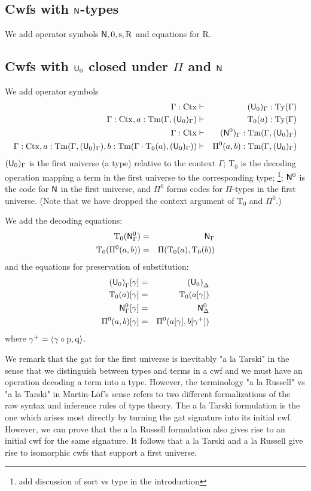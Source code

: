\documentclass{lmcs}
\newcommand{\s}{\mathrm{s}}
\newcommand{\Rec}{\mathrm{R}}
\newcommand{\Ta}{\mathrm{T}}
\def\Ctx{\mathrm{Ctx}}
\begin{document}
\subsection{Cwfs with $\mathsf{N}$-types} 
We add operator symbols $\N, 0, \s, \Rec$ and equations for $\Rec$.

\subsection{Cwfs with $\mathsf{U}_0$ closed under $\Pi$ and $\mathsf{N}$} 
We add operator symbols
\begin{eqnarray*}
\Gamma : \Ctx &\vdash& (\U_0)_\Gamma : \Ty(\Gamma)\\
\Gamma : \Ctx, a : \Tm(\Gamma,(\U_0)_\Gamma) &\vdash& {\Ta_0}(a) : \Ty(\Gamma)\\
\Gamma : \Ctx &\vdash& (\N^0)_\Gamma : \Tm(\Gamma,(\U_0)_\Gamma) \\
\Gamma : \Ctx, 
a : \Tm(\Gamma,(\U_0)_\Gamma), 
b :  \Tm(\Gamma \cdot \Ta_0(a), (\U_0)_\Gamma))
&\vdash&
 \Pi^0(a,b) : \Tm(\Gamma,(\U_0)_\Gamma)
\end{eqnarray*}
$(\mathsf{U}_0)_\Gamma$ is the first universe (a type) relative to the context $\Gamma$; $\Ta_0$ is the decoding operation mapping a term in the first universe to the corresponding type; \footnote{add discussion of sort vs type in the introduction}; $\mathsf{N}^0$ is the code for $\mathsf{N}$ in the first universe, and $\Pi^0$ forms codes for $\Pi$-types in the first universe. (Note that we have dropped the context argument of $\Ta_0$ and $\Pi^0$.)

We add the decoding equations:
\begin{eqnarray*}
\Ta_0(\N^0_\Gamma) &=& \N_\Gamma\\
\Ta_0(\Pi^0(a,b)) &=& \Pi(\Ta_0(a),\Ta_0(b))
\end{eqnarray*}
and the equations for preservation of substitution:
\begin{eqnarray*}
{(\U_0)}_\Gamma [ \gamma ] &=& {(\U_0)}_\Delta\\
\Ta_0(a) [ \gamma ] &=& \Ta_0(a[ \gamma ] )\\
\N^0_\Gamma [ \gamma ] &=&\N^0_\Delta\\
\Pi^0(a,b)[ \gamma ] &=& \Pi^0(a [ \gamma ], b[ \gamma^+ ])
\end{eqnarray*}
where $\gamma^+ = \langle \gamma \circ \mathrm{p}, \mathrm{q} \rangle$.

We remark that the gat for the first universe is inevitably "a la Tarski" in the sense that we distinguish between types and terms in a cwf and we must have an operation decoding a term into a type. However, the terminology "a la Russell" vs "a la Tarski" in Martin-Löf's sense refers to two different formalizations of the raw syntax and inference rules of type theory. The a la Tarski formulation is the one which arises most directly by turning the gat signature into its initial cwf. However, we can prove that the a la Russell formulation also gives rise to an initial cwf for the same signature. It follows that a la Tarski and a la Russell give rise to isomorphic cwfs that support a first universe.
\end{document}
